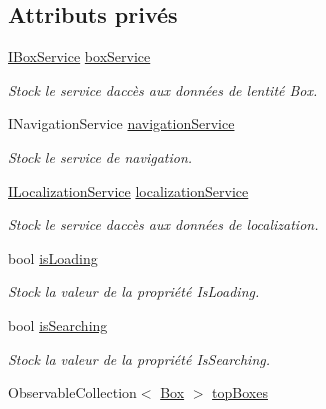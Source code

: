 \subsection*{Attributs privés}
\begin{DoxyCompactItemize}
\item 
\hyperlink{interface_boxes_1_1_services_1_1_box_1_1_i_box_service}{I\+Box\+Service} \hyperlink{class_boxes_1_1_view_models_1_1_discover_view_model_a2a376432019b9691d7186d7b836351c6}{box\+Service}
\begin{DoxyCompactList}\small\item\em Stock le service d\textquotesingle{}accès aux données de l\textquotesingle{}entité Box. \end{DoxyCompactList}\item 
I\+Navigation\+Service \hyperlink{class_boxes_1_1_view_models_1_1_discover_view_model_ada996a561fb3c2c94eb9db6837fa2bcc}{navigation\+Service}
\begin{DoxyCompactList}\small\item\em Stock le service de navigation. \end{DoxyCompactList}\item 
\hyperlink{interface_boxes_1_1_services_1_1_localization_1_1_i_localization_service}{I\+Localization\+Service} \hyperlink{class_boxes_1_1_view_models_1_1_discover_view_model_a0943f8df352f5b062555031016670a4d}{localization\+Service}
\begin{DoxyCompactList}\small\item\em Stock le service d\textquotesingle{}accès aux données de localization. \end{DoxyCompactList}\item 
bool \hyperlink{class_boxes_1_1_view_models_1_1_discover_view_model_a64b84ad405d9841f0b373beb851c9aed}{is\+Loading}
\begin{DoxyCompactList}\small\item\em Stock la valeur de la propriété {\ttfamily Is\+Loading}. \end{DoxyCompactList}\item 
bool \hyperlink{class_boxes_1_1_view_models_1_1_discover_view_model_a4a4f2b92e080881b02af2d05c64b6932}{is\+Searching}
\begin{DoxyCompactList}\small\item\em Stock la valeur de la propriété {\ttfamily Is\+Searching}. \end{DoxyCompactList}\item 
Observable\+Collection$<$ \hyperlink{class_boxes_1_1_models_1_1_box}{Box} $>$ \hyperlink{class_boxes_1_1_view_models_1_1_discover_view_model_a34bd0f598fdc837a58cf93c99413799f}{top\+Boxes}

\end{DoxyCompactItemize}
